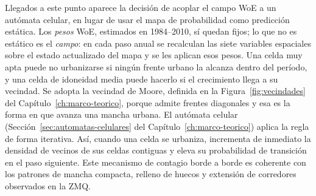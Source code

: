 Llegados a este punto aparece la decisión de acoplar el campo WoE a un autómata celular, en lugar de usar el mapa de probabilidad como predicción estática. Los \emph{pesos} WoE, estimados en 1984--2010, sí quedan fijos; lo que no es estático es el \emph{campo}: en cada paso anual se recalculan las siete variables espaciales sobre el estado actualizado del mapa y se les aplican esos pesos. Una celda muy apta puede no urbanizarse si ningún frente urbano la alcanza dentro del período, y una celda de idoneidad media puede hacerlo si el crecimiento llega a su vecindad. Se adopta la vecindad de Moore, definida en la Figura~\ref{fig:vecindades} del Capítulo~\ref{ch:marco-teorico}, porque admite frentes diagonales y esa es la forma en que avanza una mancha urbana. El autómata celular (Sección~\ref{sec:automatas-celulares} del Capítulo~\ref{ch:marco-teorico}) aplica la regla de forma iterativa. Así, cuando una celda se urbaniza, incrementa de inmediato la densidad de vecinos de sus celdas contiguas y eleva su probabilidad de transición en el paso siguiente. Este mecanismo de contagio borde a borde es coherente con los patrones de mancha compacta, relleno de huecos y extensión de corredores observados en la ZMQ.

